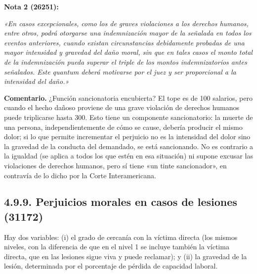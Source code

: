 \textbf{Nota 2 (26251):}

\begin{cita}
\textit{«En casos excepcionales, como los de graves violaciones a los derechos humanos, entre otros, podrá otorgarse una indemnización mayor de la señalada en todos los eventos anteriores, cuando existan circunstancias debidamente probadas de una mayor intensidad y gravedad del daño moral, sin que en tales casos el monto total de la indemnización pueda superar el triple de los montos indemnizatorios antes señalados. Este quantum deberá motivarse por el juez y ser proporcional a la intensidad del daño.»}
\end{cita}
\begin{comentario}
\textcolor[HTML]{8A6D3B}{\textbf{Comentario. }}¿Función sancionatoria encubierta? El tope es de 100 salarios, pero cuando el hecho dañoso proviene de una grave violación de derechos humanos puede triplicarse hasta 300. Esto tiene un componente sancionatorio: la muerte de una persona, independientemente de cómo se cause, debería producir el mismo dolor; si lo que permite incrementar el perjuicio no es la intensidad del dolor sino la gravedad de la conducta del demandado, se está sancionando. No es contrario a la igualdad (se aplica a todos los que estén en esa situación) ni supone excusar las violaciones de derechos humanos, pero sí tiene «un tinte sancionador», en contravía de lo dicho por la Corte Interamericana.
\end{comentario}
\subsection{4.9.9. Perjuicios morales en casos de lesiones (31172)}
Hay dos variables: (i) el grado de cercanía con la víctima directa (los mismos niveles, con la diferencia de que en el nivel 1 se incluye también la víctima directa, que en las lesiones sigue viva y puede reclamar); y (ii) la gravedad de la lesión, determinada por el porcentaje de pérdida de capacidad laboral.


